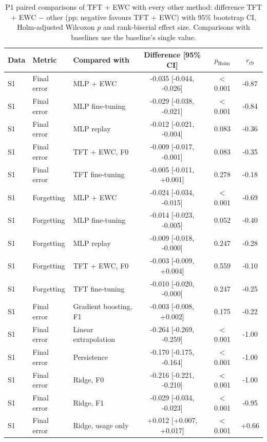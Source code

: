 \begin{table}[t]
  \centering
  \caption{P1 paired comparisons of TFT + EWC with every other method: difference TFT + EWC $-$ other (pp; negative favours TFT + EWC) with 95\% bootstrap CI, Holm-adjusted Wilcoxon $p$ and rank-biserial effect size. Comparisons with baselines use the baseline's single value.}
  \label{tab:tests}
  \begin{tabular}{lllccc}
    \toprule
    Data & Metric & Compared with & Difference [95\% CI] & $p_{\mathrm{Holm}}$ & $r_{\mathrm{rb}}$ \\
    \midrule
    S1 & Final error & MLP + EWC & -0.035 [-0.044, -0.026] & $<$0.001 & -0.87 \\
    S1 & Final error & MLP fine-tuning & -0.029 [-0.038, -0.021] & $<$0.001 & -0.84 \\
    S1 & Final error & MLP replay & -0.012 [-0.021, -0.004] & 0.083 & -0.36 \\
    S1 & Final error & TFT + EWC, F0 & -0.009 [-0.017, -0.001] & 0.083 & -0.35 \\
    S1 & Final error & TFT fine-tuning & -0.005 [-0.011, +0.001] & 0.278 & -0.18 \\
    S1 & Forgetting & MLP + EWC & -0.024 [-0.034, -0.015] & $<$0.001 & -0.69 \\
    S1 & Forgetting & MLP fine-tuning & -0.014 [-0.023, -0.005] & 0.052 & -0.40 \\
    S1 & Forgetting & MLP replay & -0.009 [-0.018, -0.000] & 0.247 & -0.28 \\
    S1 & Forgetting & TFT + EWC, F0 & -0.003 [-0.009, +0.004] & 0.559 & -0.10 \\
    S1 & Forgetting & TFT fine-tuning & -0.010 [-0.020, -0.000] & 0.247 & -0.25 \\
    S1 & Final error & Gradient boosting, F1 & -0.003 [-0.008, +0.002] & 0.175 & -0.22 \\
    S1 & Final error & Linear extrapolation & -0.264 [-0.269, -0.259] & $<$0.001 & -1.00 \\
    S1 & Final error & Persistence & -0.170 [-0.175, -0.164] & $<$0.001 & -1.00 \\
    S1 & Final error & Ridge, F0 & -0.216 [-0.221, -0.210] & $<$0.001 & -1.00 \\
    S1 & Final error & Ridge, F1 & -0.029 [-0.034, -0.023] & $<$0.001 & -0.95 \\
    S1 & Final error & Ridge, usage only & +0.012 [+0.007, +0.017] & $<$0.001 & +0.66 \\

\end{tabular}
\end{table}
